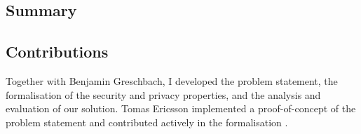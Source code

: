 \subsection{Summary}



\subsection{Contributions}
Together with Benjamin Greschbach, I developed the problem statement, the formalisation 
of the security and privacy properties, and the analysis and evaluation of our solution. 
Tomas Ericsson implemented a proof-of-concept of the problem statement and contributed 
actively in the formalisation \cite{Ericsson15}.

